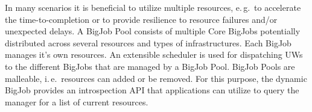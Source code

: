 \documentclass[conference,final]{IEEEtran}
\begin{document}
In many scenarios it is beneficial to utilize multiple resources, e.\,g.\ to
accelerate the time-to-completion or to provide resilience to resource failures
and/or unexpected delays. A BigJob Pool consists of multiple Core
BigJobs potentially distributed across several resources and types of
infrastructures. Each BigJob manages it's own resources. An extensible scheduler
is used for dispatching UWs to the different BigJobs that are managed by a
BigJob Pool. BigJob Pools are malleable, i.\,e.\ resources can added or be
removed. For this purpose, the dynamic BigJob provides an introspection API that 
applications can utilize to query the manager for a list of current resources.




% 


\end{document}
